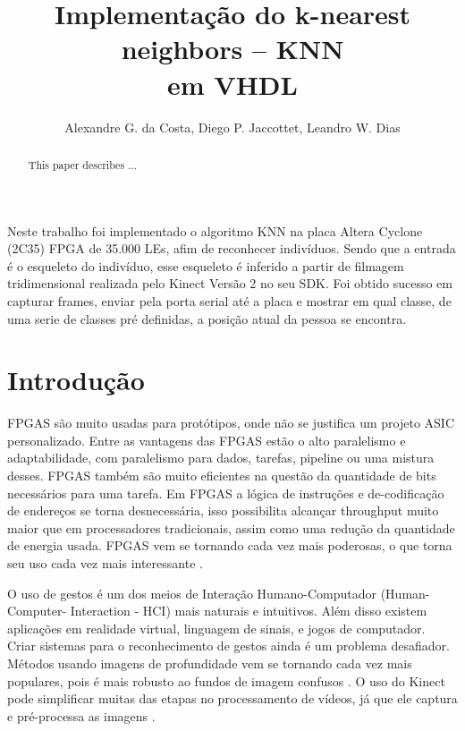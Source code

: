 \documentclass[12pt]{article}
\title{Implementa\c{c}\~ao do k-nearest neighbors -- KNN\\ em VHDL}
\author{Alexandre G. da Costa\inst{1}, Diego P. Jaccottet\inst{1}, Leandro W.
  Dias\inst{1} }
\begin{document}
 

\maketitle

\begin{abstract}
  This paper describes ...
\end{abstract}
     
\begin{resumo}

Neste trabalho foi implementado o algoritmo KNN na placa Altera Cyclone (2C35)
FPGA de 35.000 LEs, afim de reconhecer indivíduos. Sendo que a entrada é o
esqueleto do indivíduo, esse esqueleto é inferido a partir de filmagem 
tridimensional realizada pelo Kinect Versão 2 no seu SDK. Foi obtido sucesso em
capturar frames, enviar pela porta serial até a placa e mostrar em qual classe,
de uma serie de classes pré definidas, a posição atual da pessoa se encontra.

\end{resumo}

\section{Introdu\c{c}\~ao}

FPGAS são muito usadas para protótipos, onde não se justifica um projeto ASIC
personalizado. Entre as vantagens das FPGAS estão o alto paralelismo e
adaptabilidade, com paralelismo para dados, tarefas, pipeline ou uma mistura
desses. FPGAS também são muito eficientes na questão da quantidade de bits
necessários para uma tarefa. Em FPGAS a lógica de instruções e de-codificação
de endereços se torna desnecessária, isso possibilita alcançar throughput muito
maior que em processadores tradicionais, assim como uma redução da quantidade
de energia usada. FPGAS vem se tornando cada vez mais poderosas, o que torna
seu uso cada vez mais interessante \cite{najjar2003high}.

O uso de gestos é um dos meios de Interação Humano-Computador (Human-Computer-
Interaction - HCI) mais naturais e intuitivos. Além disso existem aplicações em
realidade virtual, linguagem de sinais, e jogos de computador. Criar sistemas
para o reconhecimento de gestos ainda é um problema desafiador. Métodos usando
imagens de profundidade vem se tornando cada vez mais populares, pois é mais
robusto ao fundos de imagem confusos \cite{ren2011robust}. O uso do Kinect pode
simplificar muitas das etapas no processamento de vídeos, já que ele captura e
pré-processa as imagens \cite{Andersson:2014}.
\end{document}
